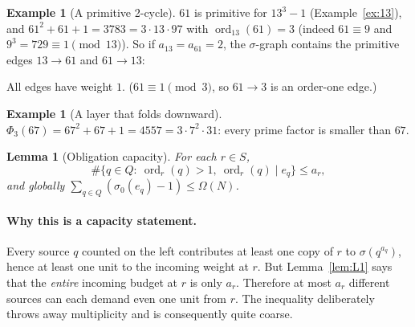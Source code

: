 \documentclass[11pt]{article}
\newtheorem{lemma}[theorem]{Lemma}
\theoremstyle{definition}
\newtheorem{example}[theorem]{Example}
\theoremstyle{remark}
\DeclareMathOperator{\ord}{ord}
\begin{document}
\begin{example}[A primitive 2-cycle]\label{ex:cycle}
$61$ is primitive for $13^3-1$ (Example~\ref{ex:13}), and
$61^2+61+1=3783=3\cdot 13\cdot 97$ with $\ord_{13}(61)=3$ (indeed
$61\equiv 9$ and $9^3=729\equiv 1\pmod{13}$). So if $a_{13}=a_{61}=2$,
the $\sigma$-graph contains the primitive edges $13\to 61$ and
$61\to 13$:

\begin{center}
\end{center}
All edges have weight $1$. ($61\equiv 1\pmod 3$, so $61\to 3$ is an
order-one edge.)
\end{example}

\begin{example}[A layer that folds downward]
$\Phi_3(67)=67^2+67+1=4557=3\cdot 7^2\cdot 31$: every prime factor is
smaller than $67$.
\end{example}

\begin{lemma}[Obligation capacity]\label{lem:L4}
For each $r\in S$,
\[
\#\{q\in Q:\ \ord_r(q)>1,\ \ord_r(q)\mid e_q\}\le a_r,\tag{L4}
\]
and globally $\sum_{q\in Q}(\sigma_0(e_q)-1)\le\Omega(N)$.
\end{lemma}

\paragraph{Why this is a capacity statement.}
Every source $q$ counted on the left contributes at least one copy of $r$ to
$\sigma(q^{a_q})$, hence at least one unit to the incoming weight at $r$.
But Lemma~\ref{lem:L1} says that the \emph{entire} incoming budget at $r$ is
only $a_r$.  Therefore at most $a_r$ different sources can each demand even
one unit from $r$.  The inequality deliberately throws away multiplicity and
is consequently quite coarse.
\end{document}

